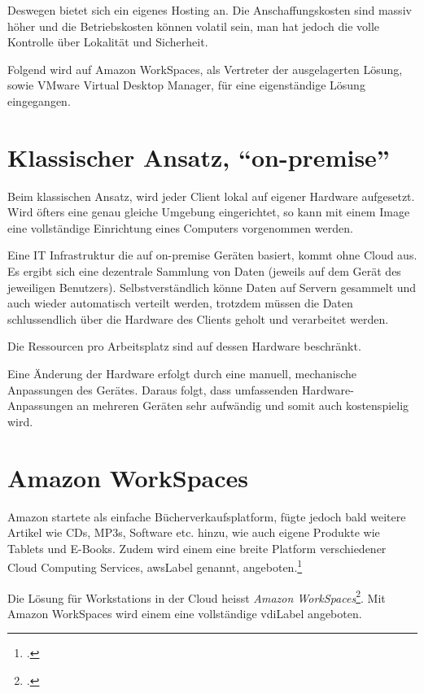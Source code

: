 Deswegen bietet sich ein eigenes Hosting an. Die Anschaffungskosten sind massiv höher und die Betriebskosten können volatil sein, man hat jedoch die volle Kontrolle über Lokalität und Sicherheit.

Folgend wird auf Amazon WorkSpaces, als Vertreter der ausgelagerten Lösung, sowie VMware Virtual Desktop Manager, für eine eigenständige Lösung eingegangen.

\section{Klassischer Ansatz, "`on-premise"'}
Beim klassischen Ansatz, wird jeder Client lokal auf eigener Hardware aufgesetzt. Wird öfters eine genau gleiche Umgebung eingerichtet, so kann mit einem Image eine vollständige Einrichtung eines Computers vorgenommen werden.

Eine IT Infrastruktur die auf on-premise Geräten basiert, kommt ohne Cloud aus. Es ergibt sich eine dezentrale Sammlung von Daten (jeweils auf dem Gerät des jeweiligen Benutzers). Selbstverständlich könne Daten auf Servern gesammelt und auch wieder automatisch verteilt werden, trotzdem müssen die Daten schlussendlich über die Hardware des Clients geholt und verarbeitet werden.

Die Ressourcen pro Arbeitsplatz sind auf dessen Hardware beschränkt.

Eine Änderung der Hardware erfolgt durch eine manuell, mechanische Anpassungen des Gerätes.
Daraus folgt, dass umfassenden Hardware-Anpassungen an mehreren Geräten sehr aufwändig und somit auch kostenspielig wird.

\newpage
\section{Amazon WorkSpaces}

Amazon startete als einfache Bücherverkaufsplatform, fügte jedoch bald weitere Artikel wie CDs, MP3s, Software etc. hinzu, wie auch eigene Produkte wie Tablets und E-Books.
Zudem wird einem eine breite Platform verschiedener Cloud Computing Services, \Gls{awsLabel} genannt, angeboten.\footcite{Amazon.com_-_Wikipedia_the_free_encyclopedia_2014-11-15}

Die Lösung für Workstations in der Cloud heisst \textit{Amazon WorkSpaces}\footcite{AWS_Amazon_WorkSpaces_2014-11-03}.
Mit Amazon WorkSpaces wird einem eine vollständige \Gls{vdiLabel} angeboten.

